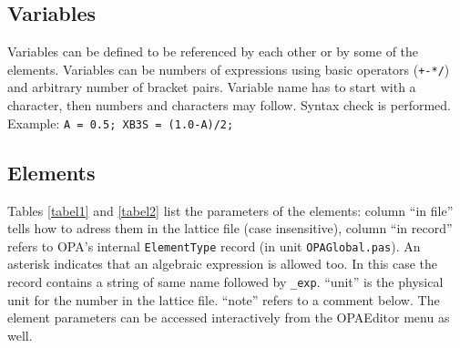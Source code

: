\documentclass[12pt]{article}
\begin{document}
\subsection{\label{ssecvar}Variables}
Variables can be defined to be referenced by each other or by some of the elements.
Variables can be numbers of expressions using basic operators ({\tt +-*/}) and arbitrary number of bracket pairs. Variable name has to start with a character, then numbers and characters may follow. Syntax check is performed. Example: {\tt A = 0.5; XB3S = (1.0-A)/2; }\\

\subsection{\label{ssecele}Elements}

Tables \ref{tabel1} and \ref{tabel2} list the parameters of the elements: column ``in file'' tells how to adress them in the lattice file (case insensitive), column ``in record'' refers to OPA's internal {\tt ElementType} record (in unit {\tt OPAGlobal.pas}). 
An asterisk indicates that an algebraic expression is allowed too. In this case the record contains a string of same name followed by {\tt \_exp}. ``unit'' is the physical unit for the number in the lattice file. ``note'' refers to a comment below.
The element parameters can be accessed interactively from the OPAEditor menu as well.
\end{document}
